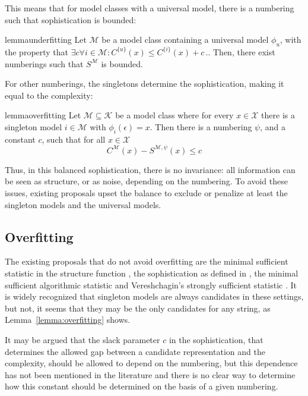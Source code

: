 \documentclass{style/llncs}
\newcommand{\M}{\mathscr M}
\newcommand{\K}{\mathscr K}
\newcommand{\X}{\mathscr X}
\newcommand{\s}{S}
\newcommand{\p}{\,\text{.}}
\begin{document}
This means that for model classes with a universal model, there is a numbering such that sophistication is bounded:
\begin{restatable}[underfitting]{lemma}{underfitting}
Let $\M$ be a model class containing a universal model $\phi_u$, with the property that $\exists c \forall i \in \M : C^{\{u\}}(x) \leq C^{\{i\}}(x) + c \p$. Then, there exist numberings such that $\s^\M$ is bounded.
\end{restatable}
\noindent For other numberings, the singletons determine the sophistication, making it equal to the complexity:
\begin{restatable}[Overfitting]{lemma}{overfitting}
Let $\M \subseteq \K$ be a model class where for every $x\in\X$ there is a singleton model $i\in\M$ with $\phi_i(\epsilon)=x$. Then there is a numbering $\psi$, and a constant $c$, such that for all $x\in\X$ 
\[
C^\M(x)-S^{\M,\psi}(x)\leq c
\]\label{lemma:overfitting}
\end{restatable}
\noindent Thus, in this balanced sophistication, there is no invariance: all information can be seen as structure, or as noise, depending on the numbering. To avoid these issues, existing proposals upset the balance to exclude or penalize at least the singleton models and the universal models.
 
\subsection{Overfitting}

The existing proposals that do not avoid overfitting are the minimal sufficient statistic in the structure function \cite{cover1985kolmogorov}, the sophistication as defined in \cite{mota2013sophistication}, the minimal sufficient algorithmic statistic \cite{gacs2001algorithmic} and Vereshchagin's strongly sufficient statistic \cite{vereshchagin2013algorithmic}. It is widely recognized that singleton models are always candidates in these settings, but not, it seems that they may be the only candidates for any string, as Lemma~\ref{lemma:overfitting} shows. 

It may be argued that the slack parameter $c$ in the sophistication, that determines the allowed gap between a candidate representation and the complexity, should be allowed to depend on the numbering, but this dependence has not been mentioned in the literature and there is no clear way to determine how this constant should be determined on the basis of a given numbering. 
\end{document}
